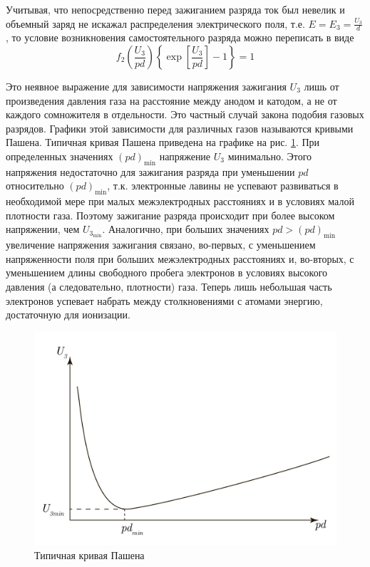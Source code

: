 \documentclass[a4paper, 12pt]{article}
\begin{document}
\par
Учитывая, что непосредственно перед зажиганием разряда ток был невелик и объемный заряд не искажал распределения электрического поля, т.е. $E=E_3=\frac{U_3}{d}$, то условие возникновения самостоятельного разряда можно переписать в виде
\begin{equation}
f_2\left(\frac{U_3}{pd}\right)\left\{\exp\left[\frac{U_3}{pd}\right]-1\right\}=1
\end{equation}
\par
Это неявное выражение для зависимости напряжения зажигания $U_3$ лишь от произведения давления газа на расстояние между анодом и катодом, а не от каждого сомножителя в отдельности. Это частный случай закона подобия газовых разрядов. Графики этой зависимости для различных газов называются кривыми Пашена. Типичная кривая Пашена приведена на графике на рис. \ref{fig:Graph4}. При определенных значениях $\left(pd\right)_{\min}$ напряжение $U_3$ минимально. Этого напряжения недостаточно для зажигания разряда при уменьшении $pd$ относительно $\left(pd\right)_{\min}$, т.к. электронные лавины не успевают развиваться в необходимой мере при малых межэлектродных расстояниях и в условиях малой плотности газа. Поэтому зажигание разряда происходит при более высоком напряжении, чем $U_{3_{\min}}$. Аналогично, при больших значениях $pd>\left(pd\right)_{\min}$ увеличение напряжения зажигания связано, во-первых, с уменьшением напряженности поля при больших межэлектродных расстояниях и, во-вторых, с уменьшением длины свободного пробега электронов в условиях высокого давления (а следовательно, плотности) газа. Теперь лишь небольшая часть электронов успевает набрать между столкновениями с атомами энергию, достаточную для ионизации.\par
\begin{figure}
	\centering
	\includegraphics[scale=0.4]{Graph4.pdf}
	\caption{Типичная кривая Пашена}
	\label{fig:Graph4}
\end{figure}
\end{document}
